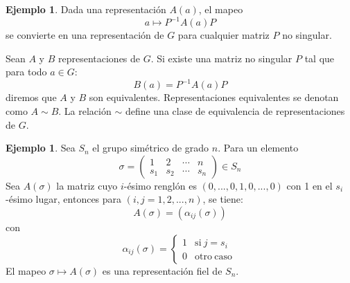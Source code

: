 \documentclass[12pt]{book}
\theoremstyle{definition}
\newtheorem{example}[theorem]{Ejemplo}
\newcounter{in}
\begin{document}
\begin{example}
  \label{Ej5}
  Dada una representación $A\left(a\right)$, el mapeo
  \begin{equation*}
    a \mapsto P^{-1}A\left(a\right)P
  \end{equation*}  
  se convierte en una representación de $G$ para cualquier matriz $P$ no singular.

  Sean $A$ y $B$ representaciones de $G$. Si existe una
  matriz no singular $P$ tal que para todo $a \in G$:
  \begin{equation*}
    B\left(a\right)= P^{-1}A\left(a\right)P
  \end{equation*}
  diremos que $A$ y $B$ son equivalentes. Representaciones equivalentes
  se denotan como $A \sim B$. La relación $\sim$
  define una clase de equivalencia de representaciones de $G$.
\end{example}

\begin{example}
  \label{Ej3}
  Sea $S_{n}$ el grupo simétrico de grado
  $n$. Para un elemento
  \begin{equation}
    \label{eq:1}
    \sigma =
    \begin{pmatrix}
      1 & 2 & \cdots  & n\\
      s_{1} & s_{2} & \cdots & s_{n}
    \end{pmatrix} 
    \in S_{n}
  \end{equation}  
  Sea $A\left(\sigma\right)$ la matriz cuyo $i$-ésimo renglón es
  $\left(0,...,0,1,0,...,0\right)$ con 1 en el $s_{i}$-ésimo lugar,
  entonces para $\left(i,j=1,2,...,n\right)$, se tiene:
  \begin{equation*}
    A\left(\sigma\right) = \left(\alpha_{ij}\left(\sigma\right)\right) 
  \end{equation*}
  con
  \begin{equation*}
    \alpha_{ij}\left(\sigma\right) = \left\{
      \begin{array}{ll}
        1      & \mathrm{si\ } j = s_{i} \\
        0      & \mathrm{otro\ caso\ } 
      \end{array}
    \right.
  \end{equation*}
  El mapeo $\sigma \mapsto A\left(\sigma\right)$ es una representación
  fiel de $S_{n}$.
\end{example}
\end{document}
